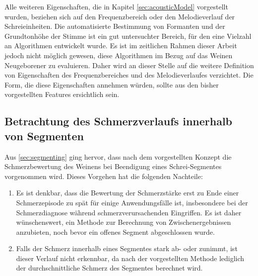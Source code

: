 Alle weiteren Eigenschaften, die in Kapitel \ref{sec:acousticModel} vorgestellt wurden, beziehen sich auf den Frequenzbereich oder den Melodieverlauf der Schreieinheiten. Die automatisierte Bestimmung von Formanten und der Grundtonhöhe der Stimme ist ein gut untersuchter Bereich, für den eine Vielzahl an Algorithmen entwickelt wurde. Es ist im zeitlichen Rahmen dieser Arbeit jedoch nicht möglich gewesen, diese Algorithmen im Bezug auf das Weinen Neugeborener zu evaluieren. Daher wird an dieser Stelle auf die weitere Definition von Eigenschaften des Frequenzbereiches und des Melodieverlaufes verzichtet. Die Form, die diese Eigenschaften annehmen würden, sollte aus den bisher vorgestellten Features ersichtlich sein. 


\subsection{Betrachtung des Schmerzverlaufs innerhalb von Segmenten}
\label{sec:regressionTimeStuff}

Aus \autoref{sec:segmenting} ging hervor, dass nach dem vorgestellten Konzept die Schmerzbewertung des Weinens bei Beendigung eines Schrei-Segmentes vorgenommen wird. Dieses Vorgehen hat die folgenden Nachteile:
\begin{enumerate}
\item Es ist denkbar, dass die Bewertung der Schmerzstärke erst zu Ende einer Schmerzepisode zu spät für einige Anwendungsfälle ist, insbesondere bei der Schmerzdiagnose während schmerzverursachenden Eingriffen. Es ist daher wünschenswert, ein Methode zur Berechnung von \glqq Zwischenergebnissen\grqq{} anzubieten, noch bevor ein offenes Segment abgeschlossen wurde.
\item Falls der Schmerz innerhalb eines Segmentes stark ab- oder zunimmt, ist dieser Verlauf nicht erkennbar, da nach der vorgestellten Methode lediglich der \glqq durchschnittliche Schmerz\grqq{} des Segmentes berechnet wird.
\end{enumerate}

